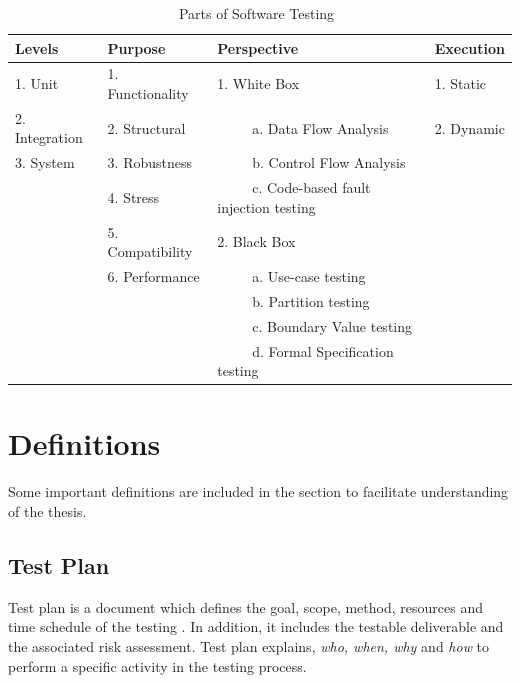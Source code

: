 \begin{table}[ht]
\caption{Parts of Software Testing~\cite{adrion1982validation, chilenski1994applicability, gaudel2010software, richardson1992specification, tracey1998automated}} %
\smallskip
\centering %
\begin{tabular}{| l | l | l | l | } %
\hline

Levels 					&Purpose		 		& Perspective						& Execution 	\\
\hline
1. Unit					&1. Functionality			& 1. White Box						& 1. Static 	\\
2. Integration			&2. Structural			& ~~~~~a. Data Flow Analysis			& 2. Dynamic\\
3. System				&3. Robustness			& ~~~~~b. Control Flow Analysis		&			\\
						&4. Stress				& ~~~~~c. Code-based fault injection testing &			\\
						&5. Compatibility			&2. Black Box						&			\\
						&6. Performance			& ~~~~~a. Use-case testing			&			\\
						&						& ~~~~~b. Partition testing			&			\\
						&						& ~~~~~c. Boundary Value testing		&			\\
						&						& ~~~~~d. Formal Specification testing	&			\\



\hline %
\end{tabular}
\bigskip
\label{table:softwareTestingParts} %
\end{table}

\section{Definitions}
Some important definitions are included in the section to facilitate understanding of the thesis.

\subsection{Test Plan}
Test plan is a document which defines the goal, scope, method, resources and time schedule of the testing \cite{futrell2001quality}. In addition, it includes the testable deliverable and the associated risk assessment. Test plan explains, {\it {who, when, why}} and {\it {how}} to perform a specific activity in the testing process. 

